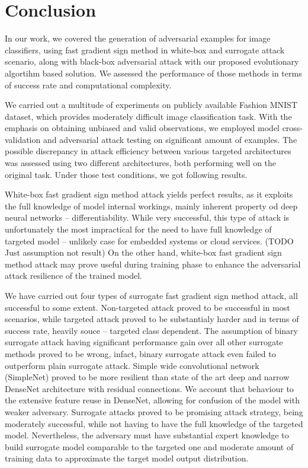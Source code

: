 \chapter*{Conclusion}

In our work, we covered the generation of adversarial examples for image classifiers, using fast gradient sign method in white-box and surrogate attack scenario, along with black-box adversarial attack with our proposed evolutionary algortihm based solution. We assessed the performance of those methods in terms of success rate and computational complexity.

We carried out a multitude of experiments on publicly available Fashion MNIST dataset, which provides moderately difficult image classification task. With the emphasis on obtaining unbiased and valid observations, we employed model cross-validation and adversarial attack testing on significant amount of examples. The possible discrepancy in attack efficiency between various targeted architectures was assessed using two different architectures, both performing well on the original task. Under those test conditions, we got following results.

White-box fast gradient sign method attack yields perfect results, as it exploits the full knowledge of model internal workings, mainly inherent property od deep neural networks -- differentiability. While very successful, this type of attack is unfortunately the most impractical for the need to have full knowledge of targeted model -- unlikely case for embedded systems or cloud services. (TODO Just assumption not result) On the other hand, white-box fast gradient sign method attack may prove useful during training phase to enhance the adversarial attack resilience of the trained model.

We have carried out four types of surrogate fast gradient sign method attack, all successful to some extent. Non-targeted attack proved to be successful in most scenarios, while targeted attack proved to be substantialy harder and in terms of success rate, heavily souce -- targeted class dependent. The assumption of binary surrogate attack having significant performance gain over all other surrogate methods proved to be wrong, infact, binary surrogate attack even failed to outperform plain surrogate attack. Simple wide convolutional network (SimpleNet) proved to be more resilient than state of the art deep and narrow DenseNet architecture with residual connections. We account that behaviour to the extensive feature reuse in DenseNet, allowing for confusion of the model with weaker adversary. Surrogate attacks proved to be promising attack strategy, being moderately successful, while not having to have the full knowledge of the targeted model. Nevertheless, the adversary must have substantial expert knowledge to build surrogate model comparable to the targeted one and moderate amount of training data to approximate the target model output distribution.

